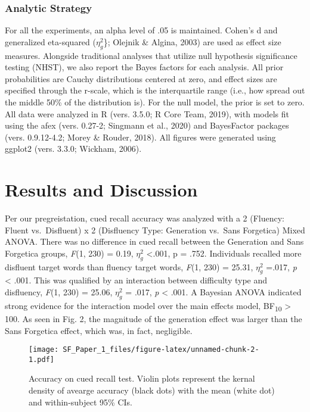 \documentclass[jou]{apa6}
\begin{document}
\hypertarget{analytic-strategy}{%
\subsubsection{Analytic Strategy}\label{analytic-strategy}}

For all the experiments, an alpha level of .05 is maintained. Cohen's d and generalized eta-squared (\(\eta_{g}^{2}\)\}; Olejnik \& Algina, 2003) are used as effect size measures. Alongside traditional analyses that utilize null hypothesis significance testing (NHST), we also report the Bayes factors for each analysis. All prior probabilities are Cauchy distributions centered at zero, and effect sizes are specified through the r-scale, which is the interquartile range (i.e., how spread out the middle 50\% of the distribution is). For the null model, the prior is set to zero. All data were analyzed in R (vers. 3.5.0; R Core Team, 2019), with models fit using the afex (vers. 0.27-2; Singmann et al., 2020) and BayesFactor packages (vers. 0.9.12-4.2; Morey \& Rouder, 2018). All figures were generated using ggplot2 (vers. 3.3.0; Wickham, 2006).

\hypertarget{results-and-discussion}{%
\section{Results and Discussion}\label{results-and-discussion}}

Per our pregreistation, cued recall accuracy was analyzed with a 2 (Fluency: Fluent vs.~Disfluent) x 2 (Disfluency Type: Generation vs.~Sans Forgetica) Mixed ANOVA. There was no difference in cued recall between the Generation and Sans Forgetica groups, \emph{F}(1, 230) = 0.19, \(\eta_{g}^{2}\) \textless{}.001, p = .752. Individuals recalled more disfluent target words than fluency target words, \emph{F}(1, 230) = 25.31, \(\eta_{g}^{2}\) =.017, \emph{p} \textless{} .001. This was qualified by an interaction between difficulty type and disfluency, \emph{F}(1, 230) = 25.06, \(\eta_{g}^{2}\) = .017, \emph{p} \textless{} .001. A Bayesian ANOVA indicated strong evidence for the interaction model over the main effects model, BF\textsubscript{10} \textgreater{} 100. As seen in Fig. 2, the magnitude of the generation effect was larger than the Sans Forgetica effect, which was, in fact, negligible.

\begin{figure}
\centering
\texttt{[image: SF\_Paper\_1\_files/figure-latex/unnamed-chunk-2-1.pdf]}
\caption{\label{fig:unnamed-chunk-2}Accuracy on cued recall test. Violin plots represent the kernal density of avearge accuracy (black dots) with the mean (white dot) and within-subject 95\% CIs.}
\end{figure}
\end{document}
